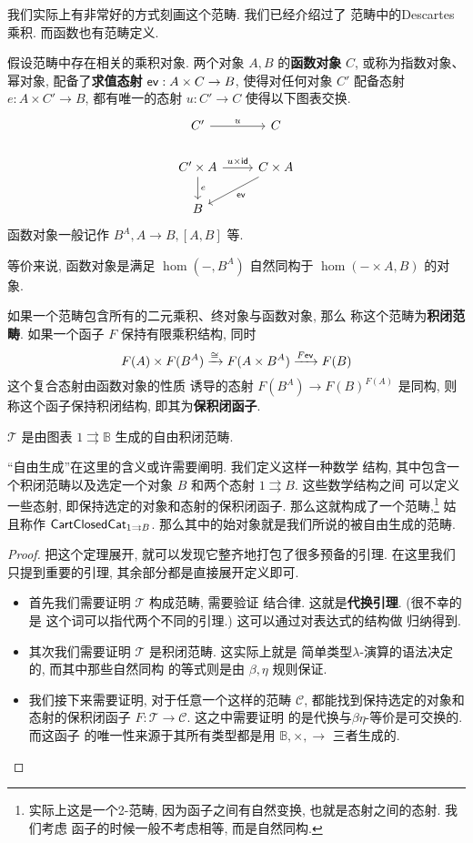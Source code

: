 我们实际上有非常好的方式刻画这个范畴. 我们已经介绍过了
范畴中的Descartes乘积. 而函数也有范畴定义.
\begin{definition}
假设范畴中存在相关的乘积对象. 两个对象 \(A, B\)
的\textbf{函数对象} \(C\), 或称为指数对象、幂对象,
配备了\textbf{求值态射} \(\textnormal{\textsf{ev}}:A \times C \to B\),
使得对任何对象 \(C'\) 配备态射 \(e : A \times C' \to B\),
都有唯一的态射 \(u : C' \to C\) 使得以下图表交换.
\[\begin{tikzcd}
{C'} & C \\
{C' \times A} & {C\times A} \\
B
\arrow["u", from=1-1, to=1-2]
\arrow["{u\times \cons{id}}", from=2-1, to=2-2]
\arrow["e", from=2-1, to=3-1]
\arrow["\cons{ev}", from=2-2, to=3-1]
\end{tikzcd}\]
函数对象一般记作 \(B^A, A \to B, [A, B]\) 等.
\end{definition}
等价来说, 函数对象是满足 \(\hom(-, B^A)\) 自然同构于
\(\hom(- \times A, B)\) 的对象.
\begin{definition}
如果一个范畴包含所有的二元乘积、终对象与函数对象, 那么
称这个范畴为\textbf{积闭范畴}. 如果一个函子 \(F\)
保持有限乘积结构, 同时
\[F(A) \times F(B^A) \xrightarrow{\cong}
F(A \times B^A) \xrightarrow{F\textnormal{\textsf{ev}}}
F(B)\] 这个复合态射由函数对象的性质
诱导的态射 \(F(B^A) \to F(B)^{F(A)}\) 是同构,
则称这个函子保持积闭结构, 即其为\textbf{保积闭函子}.
\end{definition}
\begin{lemma}\label{beginning:lambda:initial}
\(\mathcal T\) 是由图表 \(1 \rightrightarrows \mathbb B\)
生成的自由积闭范畴.
\end{lemma}
“自由生成”在这里的含义或许需要阐明. 我们定义这样一种数学
结构, 其中包含一个积闭范畴以及选定一个对象 \(B\)
和两个态射 \(1\rightrightarrows B\). 这些数学结构之间
可以定义一些态射, 即保持选定的对象和态射的保积闭函子.
那么这就构成了一个范畴,\footnote{实际上这是一个2-范畴,
因为函子之间有自然变换, 也就是态射之间的态射. 我们考虑
函子的时候一般不考虑相等, 而是自然同构.} 姑且称作
\(\textnormal{\textsf{CartClosedCat}}_{1\rightrightarrows B}\).
那么其中的始对象就是我们所说的被自由生成的范畴.

\begin{proof}
把这个定理展开, 就可以发现它整齐地打包了很多预备的引理.
在这里我们只提到重要的引理, 其余部分都是直接展开定义即可.
\begin{itemize}
\item 首先我们需要证明 \(\mathcal T\) 构成范畴, 需要验证
结合律. 这就是\textbf{代换引理}. (很不幸的是
这个词可以指代两个不同的引理.) 这可以通过对表达式的结构做
归纳得到.
\item 其次我们需要证明 \(\mathcal T\) 是积闭范畴. 这实际上就是
简单类型\(\lambda\)-演算的语法决定的, 而其中那些自然同构
的等式则是由 \(\beta,\eta\) 规则保证.
\item 我们接下来需要证明, 对于任意一个这样的范畴 \(\mathcal C\),
都能找到保持选定的对象和态射的保积闭函子
\(F : \mathcal T \to \mathcal C\). 这之中需要证明
的是代换与\(\beta\eta\)-等价是可交换的. 而这函子
的唯一性来源于其所有类型都是用
\(\mathbb B, \times, \to\) 三者生成的.\qedhere
\end{itemize}
\end{proof}

